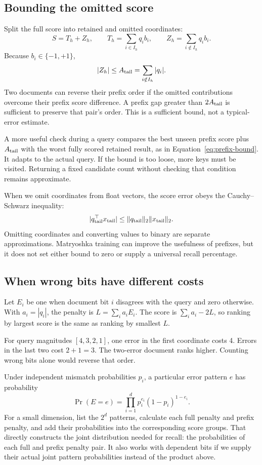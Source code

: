 \subsection{Bounding the omitted score}
Split the full score into retained and omitted coordinates:
\begin{equation}
S=T_h+Z_h,\qquad T_h=\sum_{i\in I_h}q_i b_i,\qquad
Z_h=\sum_{i\notin I_h}q_i b_i.
\end{equation}
Because $b_i\in\{-1,+1\}$,
\begin{equation}
|Z_h|\leq A_{\rm tail}=\sum_{i\notin I_h}|q_i|.
\label{eq:tail-error}
\end{equation}
Two documents can reverse their prefix order if the omitted contributions overcome their
prefix score difference. A prefix gap greater than $2A_{\rm tail}$ is sufficient to preserve
that pair's order. This is a sufficient bound, not a typical-error estimate.

A more useful check during a query compares the best unseen prefix score plus
$A_{\rm tail}$ with the worst fully scored retained result, as in Equation~\eqref{eq:prefix-bound}.
It adapts to the actual query. If the bound is too loose, more keys must be visited. Returning
a fixed candidate count without checking that condition remains approximate.

When we omit coordinates from float vectors, the score error obeys the Cauchy--Schwarz inequality:
\[
|q_{\rm tail}^{\top}x_{\rm tail}|
\leq \|q_{\rm tail}\|_2\|x_{\rm tail}\|_2.
\]
Omitting coordinates and converting values to binary are separate approximations. Matryoshka training can improve
the usefulness of prefixes, but it does not set either bound to zero or supply a universal
recall percentage.

\subsection{When wrong bits have different costs}
Let $E_i$ be one when document bit $i$ disagrees with the query and zero otherwise. With
$a_i=|q_i|$, the penalty is $L=\sum_i a_i E_i$. The score is $\sum_i a_i-2L$, so ranking by
largest score is the same as ranking by smallest $L$.

For query magnitudes $[4,3,2,1]$, one error in the first coordinate costs 4. Errors in the
last two cost $2+1=3$. The two-error document ranks higher. Counting wrong bits alone would
reverse that order.

Under independent mismatch probabilities $p_i$, a particular error pattern $e$ has probability
\begin{equation}
\Pr(E=e)=\prod_{i=1}^{d}p_i^{e_i}(1-p_i)^{1-e_i}.
\label{eq:error-pattern-probability}
\end{equation}
For a small dimension, list the $2^d$ patterns, calculate each full penalty and prefix penalty,
and add their probabilities into the corresponding score groups. That directly constructs the
joint distribution needed for recall: the probabilities of each full and prefix penalty pair. It also works with dependent bits if we supply their
actual joint pattern probabilities instead of the product above.

